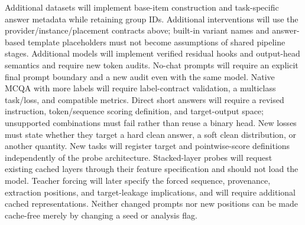 \documentclass[11pt]{article}
\begin{document}
Additional datasets will implement base-item construction and task-specific answer metadata while retaining group IDs.
Additional interventions will use the provider/instance/placement contracts above; built-in variant names and answer-based template placeholders must not become assumptions of shared pipeline stages.
Additional models will implement verified residual hooks and output-head semantics and require new token audits.
No-chat prompts will require an explicit final prompt boundary and a new audit even with the same model.
Native MCQA with more labels will require label-contract validation, a multiclass task/loss, and compatible metrics.
Direct short answers will require a revised instruction, token/sequence scoring definition, and target-output space; unsupported combinations must fail rather than reuse a binary head.
New losses must state whether they target a hard clean answer, a soft clean distribution, or another quantity.
New tasks will register target and pointwise-score definitions independently of the probe architecture.
Stacked-layer probes will request existing cached layers through their feature specification and should not load the model.
Teacher forcing will later specify the forced sequence, provenance, extraction positions, and target-leakage implications, and will require additional cached representations.
Neither changed prompts nor new positions can be made cache-free merely by changing a seed or analysis flag.
\end{document}
